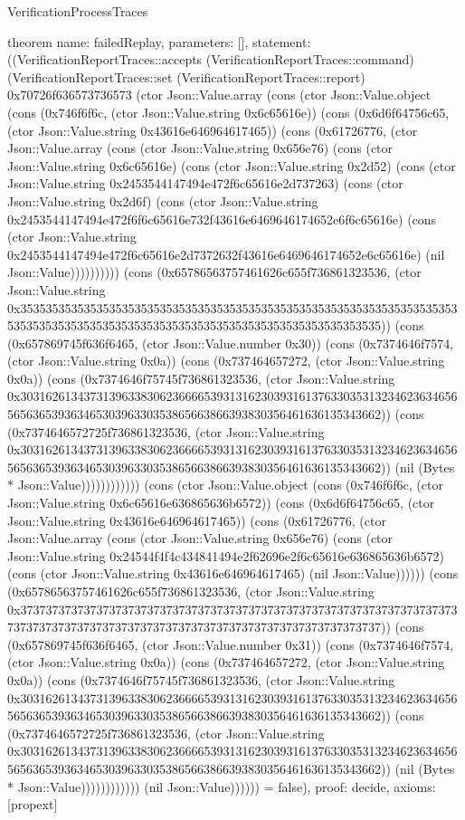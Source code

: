 \begin{lexlean}{VerificationProcessTraces}
\begin{semanticmodule}
theorem{
  name: failedReplay,
  parameters: [],
  statement: ((VerificationReportTraces::accepts (VerificationReportTraces::command) (VerificationReportTraces::set (VerificationReportTraces::report) 0x70726f636573736573 (ctor Json::Value.array (cons (ctor Json::Value.object (cons (0x746f6f6c, (ctor Json::Value.string 0x6c65616e)) (cons (0x6d6f64756c65, (ctor Json::Value.string 0x43616e646964617465)) (cons (0x61726776, (ctor Json::Value.array (cons (ctor Json::Value.string 0x656e76) (cons (ctor Json::Value.string 0x6c65616e) (cons (ctor Json::Value.string 0x2d52) (cons (ctor Json::Value.string 0x2453544147494e472f6c65616e2d737263) (cons (ctor Json::Value.string 0x2d6f) (cons (ctor Json::Value.string 0x2453544147494e472f6f6c65616e732f43616e6469646174652e6f6c65616e) (cons (ctor Json::Value.string 0x2453544147494e472f6c65616e2d7372632f43616e6469646174652e6c65616e) (nil Json::Value)))))))))) (cons (0x65786563757461626c655f736861323536, (ctor Json::Value.string 0x35353535353535353535353535353535353535353535353535353535353535353535353535353535353535353535353535353535353535353535353535353535)) (cons (0x657869745f636f6465, (ctor Json::Value.number 0x30)) (cons (0x7374646f7574, (ctor Json::Value.string 0x0a)) (cons (0x737464657272, (ctor Json::Value.string 0x0a)) (cons (0x7374646f75745f736861323536, (ctor Json::Value.string 0x30316261343731396338306236666539313162303931613763303531323462363465656563653936346530396330353865663866393830356461636135343662)) (cons (0x7374646572725f736861323536, (ctor Json::Value.string 0x30316261343731396338306236666539313162303931613763303531323462363465656563653936346530396330353865663866393830356461636135343662)) (nil (Bytes * Json::Value)))))))))))) (cons (ctor Json::Value.object (cons (0x746f6f6c, (ctor Json::Value.string 0x6c65616e636865636b6572)) (cons (0x6d6f64756c65, (ctor Json::Value.string 0x43616e646964617465)) (cons (0x61726776, (ctor Json::Value.array (cons (ctor Json::Value.string 0x656e76) (cons (ctor Json::Value.string 0x24544f4f4c434841494e2f62696e2f6c65616e636865636b6572) (cons (ctor Json::Value.string 0x43616e646964617465) (nil Json::Value)))))) (cons (0x65786563757461626c655f736861323536, (ctor Json::Value.string 0x37373737373737373737373737373737373737373737373737373737373737373737373737373737373737373737373737373737373737373737373737373737)) (cons (0x657869745f636f6465, (ctor Json::Value.number 0x31)) (cons (0x7374646f7574, (ctor Json::Value.string 0x0a)) (cons (0x737464657272, (ctor Json::Value.string 0x0a)) (cons (0x7374646f75745f736861323536, (ctor Json::Value.string 0x30316261343731396338306236666539313162303931613763303531323462363465656563653936346530396330353865663866393830356461636135343662)) (cons (0x7374646572725f736861323536, (ctor Json::Value.string 0x30316261343731396338306236666539313162303931613763303531323462363465656563653936346530396330353865663866393830356461636135343662)) (nil (Bytes * Json::Value)))))))))))) (nil Json::Value)))))) = false),
  proof: decide{},
  axioms: [propext]
}


\end{semanticmodule}
\end{lexlean}
